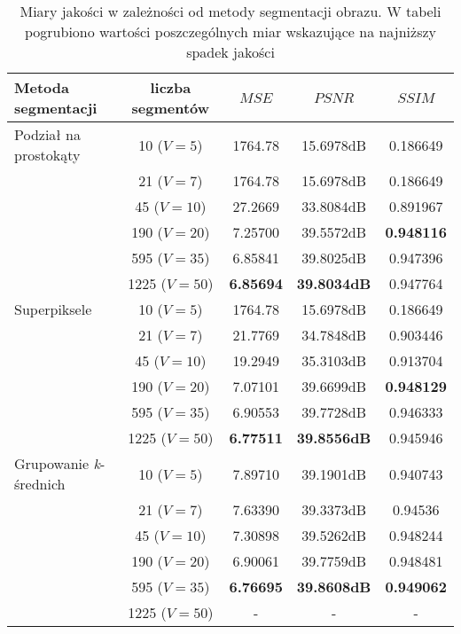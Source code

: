 {{{            \begin{table}
                \centering
                \caption{Miary jakości w zależności od metody segmentacji obrazu. W tabeli pogrubiono wartości poszczególnych miar wskazujące na najniższy spadek jakości}
                \begin{tabular}{ |l|c|c c c| }
                    \hline
                    Metoda segmentacji & liczba segmentów & $MSE$ & $PSNR$ & $SSIM$ \\
                    \hline
                    Podział na prostokąty & 10   ($V=5$)  & 1764.78 & 15.6978dB & 0.186649 \\
                                        & 21   ($V=7$)  & 1764.78 & 15.6978dB & 0.186649 \\
                                        & 45   ($V=10$) & 27.2669 & 33.8084dB & 0.891967 \\
                                        & 190  ($V=20$) & 7.25700 & 39.5572dB & \textbf{0.948116} \\
                                        & 595  ($V=35$) & 6.85841 & 39.8025dB & 0.947396 \\
                                        & 1225 ($V=50$) & \textbf{6.85694} & \textbf{39.8034dB} & 0.947764 \\
                    \hline
                    Superpiksele          & 10   ($V=5$)  & 1764.78 & 15.6978dB & 0.186649 \\
                                        & 21   ($V=7$)  & 21.7769 & 34.7848dB & 0.903446 \\
                                        & 45   ($V=10$) & 19.2949 & 35.3103dB & 0.913704 \\
                                        & 190  ($V=20$) & 7.07101 & 39.6699dB & \textbf{0.948129} \\
                                        & 595  ($V=35$) & 6.90553 & 39.7728dB & 0.946333 \\
                                        & 1225 ($V=50$) & \textbf{6.77511} & \textbf{39.8556dB} & 0.945946 \\
                    \hline
                    Grupowanie \textit{k}-średnich & 10   ($V=5$)  & 7.89710 & 39.1901dB & 0.940743 \\
                                        & 21   ($V=7$)  & 7.63390 & 39.3373dB & 0.94536 \\
                                        & 45   ($V=10$) & 7.30898 & 39.5262dB & 0.948244 \\
                                        & 190  ($V=20$) & 6.90061 & 39.7759dB & 0.948481 \\
                                        & 595  ($V=35$) & \textbf{6.76695} & \textbf{39.8608dB} & \textbf{0.949062} \\
                                        & 1225 ($V=50$) & - & - & - \\
                    \hline
                \end{tabular}
                \label{tab:exp-edge-results}
            \end{table}

}}}
